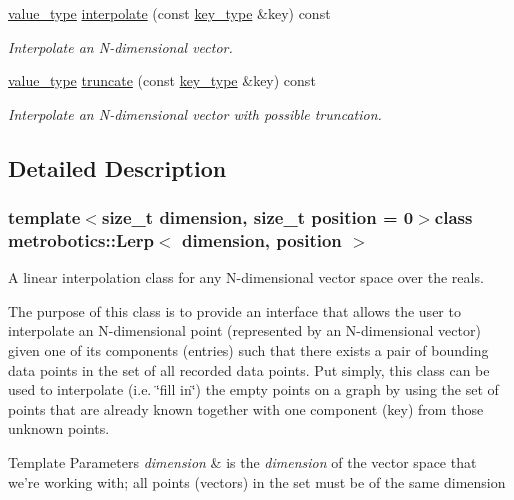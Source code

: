 \begin{DoxyCompactItemize}
\hyperlink{classmetrobotics_1_1Lerp_ab1be5a6a96856f10c5eadc416d630a40}{value\-\_\-type} \hyperlink{classmetrobotics_1_1Lerp_ae99b7e367d931570c78b87816bfb6a83}{interpolate} (const \hyperlink{classmetrobotics_1_1Lerp_a3cd6f9215623083b5ed90f4c03ac6dc7}{key\-\_\-type} \&key) const 
\begin{DoxyCompactList}\small\item\em \-Interpolate an \-N-\/dimensional vector. \end{DoxyCompactList}\item 
\hyperlink{classmetrobotics_1_1Lerp_ab1be5a6a96856f10c5eadc416d630a40}{value\-\_\-type} \hyperlink{classmetrobotics_1_1Lerp_afff98461546c80fcb3fe0e3880a45a41}{truncate} (const \hyperlink{classmetrobotics_1_1Lerp_a3cd6f9215623083b5ed90f4c03ac6dc7}{key\-\_\-type} \&key) const 
\begin{DoxyCompactList}\small\item\em \-Interpolate an \-N-\/dimensional vector with possible truncation. \end{DoxyCompactList}\end{DoxyCompactItemize}


\subsection{\-Detailed \-Description}
\subsubsection*{template$<$size\-\_\-t dimension, size\-\_\-t position = 0$>$class metrobotics\-::\-Lerp$<$ dimension, position $>$}

\-A linear interpolation class for any \-N-\/dimensional vector space over the reals. 

\-The purpose of this class is to provide an interface that allows the user to interpolate an \-N-\/dimensional point (represented by an \-N-\/dimensional vector) given one of its components (entries) such that there exists a pair of bounding data points in the set of all recorded data points. \-Put simply, this class can be used to interpolate (i.\-e. \char`\"{}fill in\char`\"{}) the empty points on a graph by using the set of points that are already known together with one component (key) from those unknown points.

\label{classmetrobotics_1_1VectorN_dimension}%
\hypertarget{classmetrobotics_1_1VectorN_dimension}{}%
 
\begin{DoxyTemplParams}{\-Template Parameters}
{\em dimension} & is the {\itshape dimension\/} of the vector space that we're working with; all points (vectors) in the set must be of the same dimension\\
\hline
\end{DoxyTemplParams}
\label{classmetrobotics_1_1Lerp_position}%
\hypertarget{classmetrobotics_1_1Lerp_position}{}%
 
